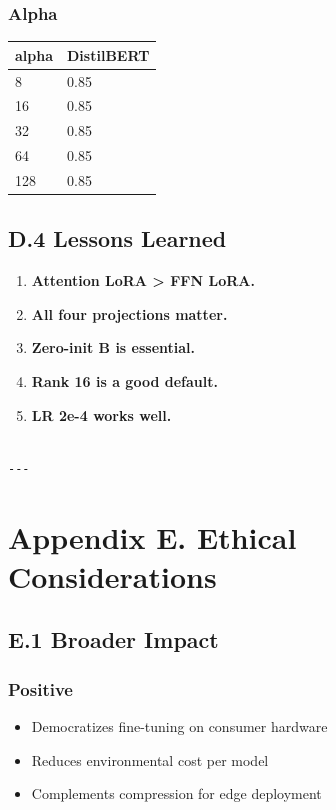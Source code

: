 \subsubsection{Alpha}

\begin{table}[H]
\centering
\small
\begin{tabular}{ll}
\toprule
\textbf{alpha} & \textbf{DistilBERT} \\
\midrule
8 & 0.85 \\
16 & 0.85 \\
32 & 0.85 \\
64 & 0.85 \\
128 & 0.85 \\
\bottomrule
\end{tabular}
\end{table}

\subsection{D.4 Lessons Learned}

\begin{enumerate}
\item \textbf{Attention LoRA \textgreater{} FFN LoRA.}
\item \textbf{All four projections matter.}
\item \textbf{Zero-init B is essential.}
\item \textbf{Rank 16 is a good default.}
\item \textbf{LR 2e-4 works well.}
\end{enumerate}
\begin{lstlisting}

---
\end{lstlisting}

\section{Appendix E. Ethical Considerations}

\subsection{E.1 Broader Impact}

\subsubsection{Positive}
\begin{itemize}
\item Democratizes fine-tuning on consumer hardware
\item Reduces environmental cost per model
\item Complements compression for edge deployment

\end{itemize}
